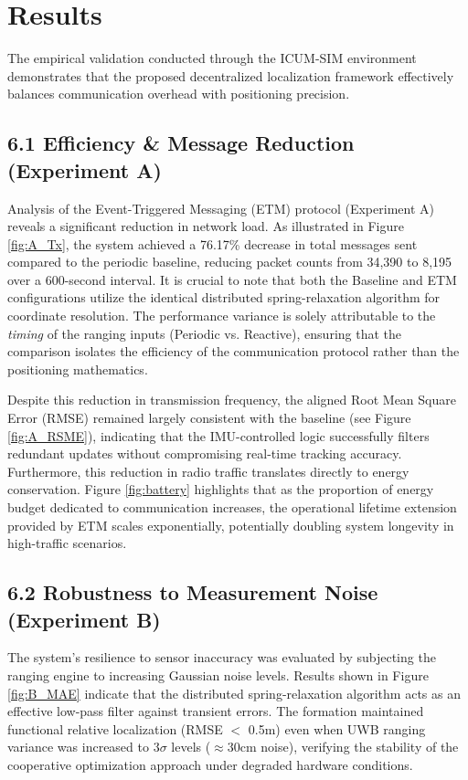 
\section{Results}

\noindent The empirical validation conducted through the ICUM-SIM environment demonstrates that the proposed decentralized localization framework effectively balances communication overhead with positioning precision.

\subsection*{6.1 Efficiency & Message Reduction (Experiment A)}
\noindent Analysis of the Event-Triggered Messaging (ETM) protocol (Experiment A) reveals a significant reduction in network load. As illustrated in Figure \ref{fig:A_Tx}, the system achieved a 76.17\% decrease in total messages sent compared to the periodic baseline, reducing packet counts from 34,390 to 8,195 over a 600-second interval. It is crucial to note that both the Baseline and ETM configurations utilize the identical distributed spring-relaxation algorithm for coordinate resolution. The performance variance is solely attributable to the \textit{timing} of the ranging inputs (Periodic vs. Reactive), ensuring that the comparison isolates the efficiency of the communication protocol rather than the positioning mathematics.

\noindent Despite this reduction in transmission frequency, the aligned Root Mean Square Error (RMSE) remained largely consistent with the baseline (see Figure \ref{fig:A_RSME}), indicating that the IMU-controlled logic successfully filters redundant updates without compromising real-time tracking accuracy. Furthermore, this reduction in radio traffic translates directly to energy conservation. Figure \ref{fig:battery} highlights that as the proportion of energy budget dedicated to communication increases, the operational lifetime extension provided by ETM scales exponentially, potentially doubling system longevity in high-traffic scenarios.

\subsection*{6.2 Robustness to Measurement Noise (Experiment B)}
\noindent The system's resilience to sensor inaccuracy was evaluated by subjecting the ranging engine to increasing Gaussian noise levels. Results shown in Figure \ref{fig:B_MAE} indicate that the distributed spring-relaxation algorithm acts as an effective low-pass filter against transient errors. The formation maintained functional relative localization (RMSE $<$ 0.5m) even when UWB ranging variance was increased to $3\sigma$ levels ($\approx 30$cm noise), verifying the stability of the cooperative optimization approach under degraded hardware conditions.

